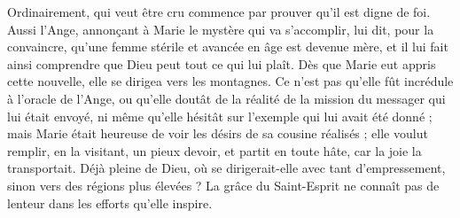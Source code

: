 Ordinairement, qui veut être cru commence par prouver qu’il est digne de foi. Aussi l’Ange, annonçant à Marie le mystère qui va s’accomplir, lui dit, pour la convaincre, qu’une femme stérile et avancée en âge est devenue mère, et il lui fait ainsi comprendre que Dieu peut tout ce qui lui plaît. Dès que Marie eut appris cette nouvelle, elle se dirigea vers les montagnes. Ce n’est pas qu’elle fût incrédule à l’oracle de l’Ange, ou qu’elle doutât de la réalité de la mission du messager qui lui était envoyé, ni même qu’elle hésitât sur l’exemple qui lui avait été donné ; mais Marie était heureuse de voir les désirs de sa cousine réalisés ; elle voulut remplir, en la visitant, un pieux devoir, et partit en toute hâte, car la joie la transportait. Déjà pleine de Dieu, où se dirigerait-elle avec tant d’empressement, sinon vers des régions plus élevées ? La grâce du Saint-Esprit ne connaît pas de lenteur dans les efforts qu’elle inspire.